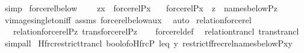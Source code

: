 \begin{isabellebody}
\ simp\isanewline
{}\isamarkupfalse%
%
\endisatagproof
{\isafoldproof}%
%
\isadelimproof
\isanewline
%
\endisadelimproof
\isanewline
{}\isamarkupfalse%
\ forcerel{\isacharunderscore}{\kern0pt}below\ {\isacharcolon}{\kern0pt}\isanewline
\ \ \ {\isachardoublequoteopen}{\isasymlangle}z{\isacharcomma}{\kern0pt}x{\isasymrangle}\ {\isasymin}\ forcerel{\isacharparenleft}{\kern0pt}P{\isacharcomma}{\kern0pt}x{\isacharparenright}{\kern0pt}{\isachardoublequoteclose}\isanewline
\ \ \ {\isachardoublequoteopen}forcerel{\isacharparenleft}{\kern0pt}P{\isacharcomma}{\kern0pt}x{\isacharparenright}{\kern0pt}\ {\isacharminus}{\kern0pt}{\isacharbackquote}{\kern0pt}{\isacharbackquote}{\kern0pt}\ {\isacharbraceleft}{\kern0pt}z{\isacharbraceright}{\kern0pt}\ {\isasymsubseteq}\ names{\isacharunderscore}{\kern0pt}below{\isacharparenleft}{\kern0pt}P{\isacharcomma}{\kern0pt}z{\isacharparenright}{\kern0pt}{\isachardoublequoteclose}\isanewline
%
\isadelimproof
\ \ %
\endisadelimproof
%
\isatagproof
{}\isamarkupfalse%
\ vimage{\isacharunderscore}{\kern0pt}singleton{\isacharunderscore}{\kern0pt}iff\ assms\ forcerel{\isacharunderscore}{\kern0pt}below{\isacharunderscore}{\kern0pt}aux\ \isamarkupfalse%
\ auto%
\endisatagproof
{\isafoldproof}%
%
\isadelimproof
\isanewline
%
\endisadelimproof
\isanewline
{}\isamarkupfalse%
\ relation{\isacharunderscore}{\kern0pt}forcerel\ {\isacharcolon}{\kern0pt}\isanewline
\ \ \ {\isachardoublequoteopen}relation{\isacharparenleft}{\kern0pt}forcerel{\isacharparenleft}{\kern0pt}P{\isacharcomma}{\kern0pt}z{\isacharparenright}{\kern0pt}{\isacharparenright}{\kern0pt}{\isachardoublequoteclose}\ {\isachardoublequoteopen}trans{\isacharparenleft}{\kern0pt}forcerel{\isacharparenleft}{\kern0pt}P{\isacharcomma}{\kern0pt}z{\isacharparenright}{\kern0pt}{\isacharparenright}{\kern0pt}{\isachardoublequoteclose}\isanewline
%
\isadelimproof
\ \ %
\endisadelimproof
%
\isatagproof
{}\isamarkupfalse%
\ forcerel{\isacharunderscore}{\kern0pt}def\ \isamarkupfalse%
\ relation{\isacharunderscore}{\kern0pt}trancl\ trans{\isacharunderscore}{\kern0pt}trancl\ \isamarkupfalse%
\ simp{\isacharunderscore}{\kern0pt}all%
\endisatagproof
{\isafoldproof}%
%
\isadelimproof
\isanewline
%
\endisadelimproof
\isanewline
{}\isamarkupfalse%
\ Hfrc{\isacharunderscore}{\kern0pt}restrict{\isacharunderscore}{\kern0pt}trancl{\isacharcolon}{\kern0pt}\ {\isachardoublequoteopen}bool{\isacharunderscore}{\kern0pt}of{\isacharunderscore}{\kern0pt}o{\isacharparenleft}{\kern0pt}Hfrc{\isacharparenleft}{\kern0pt}P{\isacharcomma}{\kern0pt}\ leq{\isacharcomma}{\kern0pt}\ y{\isacharcomma}{\kern0pt}\ restrict{\isacharparenleft}{\kern0pt}f{\isacharcomma}{\kern0pt}frecrel{\isacharparenleft}{\kern0pt}names{\isacharunderscore}{\kern0pt}below{\isacharparenleft}{\kern0pt}P{\isacharcomma}{\kern0pt}x{\isacharparenright}{\kern0pt}{\isacharparenright}{\kern0pt}{\isacharminus}{\kern0pt}{\isacharbackquote}{\kern0pt}{\isacharbackquote}{\kern0pt}{\isacharbraceleft}{\kern0pt}y{\isacharbraceright}{\kern0pt}{\isacharparenright}{\kern0pt}{\isacharparenright}{\kern0pt}{\isacharparenright}{\kern0pt}\isanewline

\end{isabellebody}
